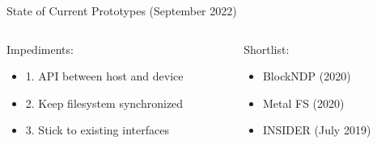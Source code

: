 \documentclass[aspectratio=169, notes]{beamer}
\begin{document}
\begin{frame}{State of Current Prototypes (September 2022)}
    \begin{columns}
        \begin{column}{0.5\textwidth}
            Impediments:
            \footnotesize
            \begin{itemize}
                \item 1. API between host and device
                \item 2. Keep filesystem synchronized
                \item 3. Stick to existing interfaces
            \end{itemize}
        \end{column}
        \begin{column}{0.5\textwidth}
            Shortlist:
            \footnotesize
            \begin{itemize}
                \item BlockNDP (2020) \footnotemark[2]
                \item Metal FS (2020) \footnotemark[3]
                \item INSIDER (July 2019) \footnotemark[4]
            \end{itemize}
        \end{column}
    \end{columns}
\end{frame}
\end{document}
